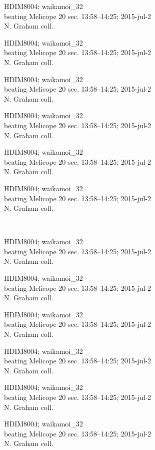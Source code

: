 \documentclass[2pt]{extarticle}
\begin{document}
\noindent
\parbox{0.16\textwidth}{\tiny \raggedright \rule[-0.3\baselineskip]{0pt}{10pt}HDIM8004; waikamoi\_32\\ beating Melicope 20 sec. 13:58--14:25; 2015-jul-2\\ N. Graham coll.}
\parbox{0.16\textwidth}{\tiny \raggedright \rule[-0.3\baselineskip]{0pt}{10pt}HDIM8004; waikamoi\_32\\ beating Melicope 20 sec. 13:58--14:25; 2015-jul-2\\ N. Graham coll.}
\parbox{0.16\textwidth}{\tiny \raggedright \rule[-0.3\baselineskip]{0pt}{10pt}HDIM8004; waikamoi\_32\\ beating Melicope 20 sec. 13:58--14:25; 2015-jul-2\\ N. Graham coll.}
\parbox{0.16\textwidth}{\tiny \raggedright \rule[-0.3\baselineskip]{0pt}{10pt}HDIM8004; waikamoi\_32\\ beating Melicope 20 sec. 13:58--14:25; 2015-jul-2\\ N. Graham coll.}
\parbox{0.16\textwidth}{\tiny \raggedright \rule[-0.3\baselineskip]{0pt}{10pt}HDIM8004; waikamoi\_32\\ beating Melicope 20 sec. 13:58--14:25; 2015-jul-2\\ N. Graham coll.}
\parbox{0.16\textwidth}{\tiny \raggedright \rule[-0.3\baselineskip]{0pt}{10pt}HDIM8004; waikamoi\_32\\ beating Melicope 20 sec. 13:58--14:25; 2015-jul-2\\ N. Graham coll.} \\ 
\vspace{0.001in} 

\noindent
\parbox{0.16\textwidth}{\tiny \raggedright \rule[-0.3\baselineskip]{0pt}{10pt}HDIM8004; waikamoi\_32\\ beating Melicope 20 sec. 13:58--14:25; 2015-jul-2\\ N. Graham coll.}
\parbox{0.16\textwidth}{\tiny \raggedright \rule[-0.3\baselineskip]{0pt}{10pt}HDIM8004; waikamoi\_32\\ beating Melicope 20 sec. 13:58--14:25; 2015-jul-2\\ N. Graham coll.}
\parbox{0.16\textwidth}{\tiny \raggedright \rule[-0.3\baselineskip]{0pt}{10pt}HDIM8004; waikamoi\_32\\ beating Melicope 20 sec. 13:58--14:25; 2015-jul-2\\ N. Graham coll.}
\parbox{0.16\textwidth}{\tiny \raggedright \rule[-0.3\baselineskip]{0pt}{10pt}HDIM8004; waikamoi\_32\\ beating Melicope 20 sec. 13:58--14:25; 2015-jul-2\\ N. Graham coll.}
\parbox{0.16\textwidth}{\tiny \raggedright \rule[-0.3\baselineskip]{0pt}{10pt}HDIM8004; waikamoi\_32\\ beating Melicope 20 sec. 13:58--14:25; 2015-jul-2\\ N. Graham coll.}
\parbox{0.16\textwidth}{\tiny \raggedright \rule[-0.3\baselineskip]{0pt}{10pt}HDIM8004; waikamoi\_32\\ beating Melicope 20 sec. 13:58--14:25; 2015-jul-2\\ N. Graham coll.} \\ 
\vspace{0.001in} 
\end{document}
